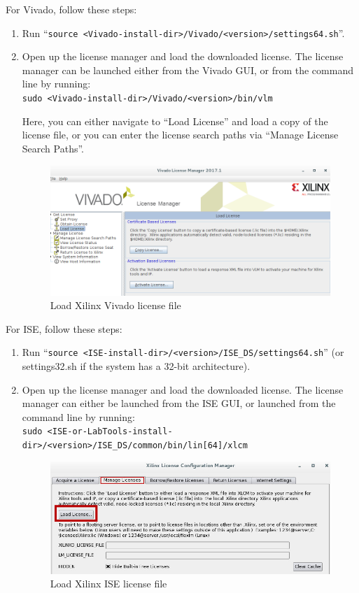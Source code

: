 For Vivado, follow these steps:
\begin{enumerate}

\item Run ``\verb+source <Vivado-install-dir>/Vivado/<version>/settings64.sh+''.

\item Open up the license manager and load the downloaded license. The license manager can be launched either from the Vivado GUI, or from the command line by running: \\\verb+sudo <Vivado-install-dir>/Vivado/<version>/bin/vlm+\newline

Here, you can either navigate to ``Load License'' and load a copy of the license file, or you can enter the license search paths via ``Manage License Search Paths''.

\begin{figure}[H]
	\centerline{\includegraphics[scale=0.5]{./figures/xilinx_vivado_license_load}}
	\caption{Load Xilinx Vivado license file}
\end{figure}
\end{enumerate}

For ISE, follow these steps:
\begin{enumerate}
\item Run ``\verb+source <ISE-install-dir>/<version>/ISE_DS/settings64.sh+'' (or settings32.sh if the system has a 32-bit architecture).

\item Open up the license manager and load the downloaded license. The license manager can either be launched from the ISE GUI, or launched from the command line by running: \\\verb+sudo <ISE-or-LabTools-install-dir>/<version>/ISE_DS/common/bin/lin[64]/xlcm+

\begin{figure}[H]
	\centerline{\includegraphics[scale=0.5]{./figures/xilinx_license_load.jpg}}
	\caption{Load Xilinx ISE license file}
\end{figure}
\end{enumerate}

